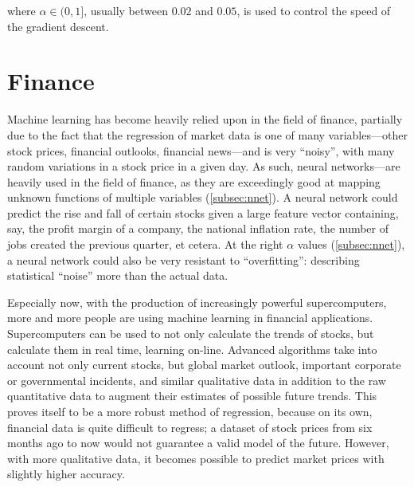 \documentclass{comjnl}
\numberwithin{equation}{subsection}
\begin{document}
            \noindent where $\alpha \in (0,1]$, usually between $0.02$ and $0.05$, is used to
            control the speed of the gradient descent.


    \section{Finance}

        Machine learning has become heavily relied upon in the field of finance, partially due to
        the fact that the regression of market data is one of many variables---other stock prices,
        financial outlooks, financial news---and is very ``noisy'', with many random variations in
        a stock price in a given day. As such, neural networks---are heavily used in the field of
        finance, as they are exceedingly good at mapping unknown functions of multiple variables
        (\ref{subsec:nnet}). A neural network could predict the rise and fall of certain stocks
        given a large feature vector containing, say, the profit margin of a company, the national
        inflation rate, the number of jobs created the previous quarter, et cetera. At the right
        $\alpha$ values (\ref{subsec:nnet}), a neural network could also be very resistant to
        ``overfitting'': describing statistical ``noise'' more than the actual data.

        Especially now, with the production of increasingly powerful supercomputers, more and more
        people are using machine learning in financial applications.  Supercomputers can be used to
        not only calculate the trends of stocks, but calculate them in real time, learning on-line.
        Advanced algorithms take into account not only current stocks, but global market outlook,
        important corporate or governmental incidents, and similar qualitative data in addition to
        the raw quantitative data to augment their estimates of possible future trends. This
        proves itself to be a more robust method of regression, because on its own, financial
        data is quite difficult to regress; a dataset of stock prices from six months ago to now
        would not guarantee a valid model of the future. However, with more qualitative data, it
        becomes possible to predict market prices with slightly higher accuracy.
\end{document}
